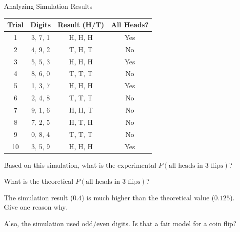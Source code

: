\begin{practiceBox}[funTeal]{Analyzing Simulation Results}


\begin{center}
\begin{tabular}{|c|c|c|c|}
\hline
\textbf{Trial} & \textbf{Digits} & \textbf{Result (H/T)} & \textbf{All Heads?} \\
\hline
1 & 3, 7, 1 & H, H, H & Yes \\
2 & 4, 9, 2 & T, H, T & No \\
3 & 5, 5, 3 & H, H, H & Yes \\
4 & 8, 6, 0 & T, T, T & No \\
5 & 1, 3, 7 & H, H, H & Yes \\
6 & 2, 4, 8 & T, T, T & No \\
7 & 9, 1, 6 & H, H, T & No \\
8 & 7, 2, 5 & H, T, H & No \\
9 & 0, 8, 4 & T, T, T & No \\
10 & 3, 5, 9 & H, H, H & Yes \\
\hline
\end{tabular}
\end{center}

\prob Based on this simulation, what is the experimental $P(\text{all heads in 3 flips})$? \answerBlank[3cm]

\prob What is the theoretical $P(\text{all heads in 3 flips})$? \answerBlank[3cm]

\prob The simulation result ($0.4$) is much higher than the theoretical value ($0.125$). Give one reason why. \answerBlank[5cm]

\prob Also, the simulation used odd/even digits. Is that a fair model for a coin flip? \answerBlank[5cm]

\end{practiceBox}

